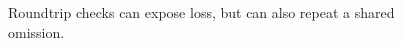 \begin{figure}[H]
\centering
{}
\caption{Roundtrip checks can expose loss, but can also repeat a shared omission.}\label{fig:teach-M04-11}
\end{figure}
